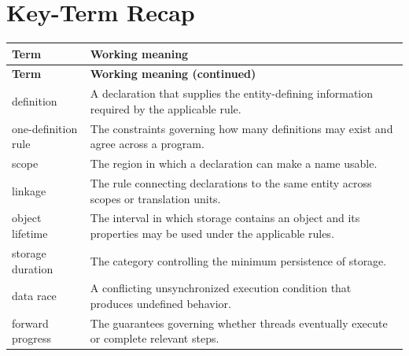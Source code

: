 \documentclass[11pt,letterpaper]{article}
\begin{document}
\section{Key-Term Recap}
\begin{longtable}{@{}>{\RaggedRight\arraybackslash}p{}>{\RaggedRight\arraybackslash}p{}@{}}\toprule\textbf{Term} & \textbf{Working meaning}\\\midrule\endfirsthead\toprule\textbf{Term} & \textbf{Working meaning (continued)}\\\midrule\endhead\bottomrule\endfoot
definition & A declaration that supplies the entity-defining information required by the applicable rule.\\
one-definition rule & The constraints governing how many definitions may exist and agree across a program.\\
scope & The region in which a declaration can make a name usable.\\
linkage & The rule connecting declarations to the same entity across scopes or translation units.\\
object lifetime & The interval in which storage contains an object and its properties may be used under the applicable rules.\\
storage duration & The category controlling the minimum persistence of storage.\\
data race & A conflicting unsynchronized execution condition that produces undefined behavior.\\
forward progress & The guarantees governing whether threads eventually execute or complete relevant steps.\\
\end{longtable}
\end{document}
